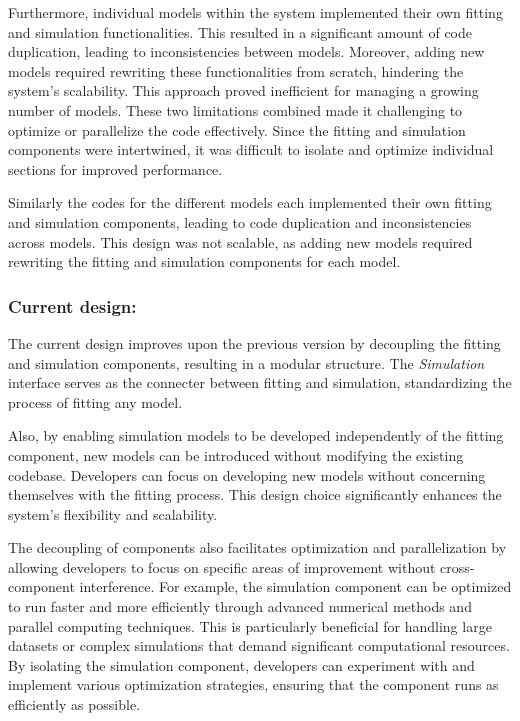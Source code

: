 Furthermore, individual models within the system implemented their own fitting and simulation functionalities. This resulted in a 
significant amount of code duplication, leading to inconsistencies between models. Moreover, adding new models required rewriting 
these functionalities from scratch, hindering the system's scalability. This approach proved inefficient for managing a growing number 
of models. These two limitations combined made it challenging to optimize or parallelize the code effectively. Since the fitting and 
simulation components were intertwined, it was difficult to isolate and optimize individual sections for improved performance.

\medskip

Similarly the codes for the different models each implemented their own fitting and simulation
components, leading to code duplication and inconsistencies across models. This design was not
scalable, as adding new models required rewriting the fitting and simulation components for each
model.

\subsubsection*{Current design:}

The current design improves upon the previous version by decoupling the fitting and 
simulation components, resulting in a modular structure. The \textit{Simulation} interface serves
 as the connecter between fitting and simulation, standardizing the process of fitting 
 any model.

\medskip

Also, by enabling simulation models to be developed independently of the fitting component, 
new models can be introduced without modifying the existing codebase. Developers can 
focus on developing new models without concerning themselves with the fitting process. 
This design choice significantly enhances the system's flexibility and scalability.

\medskip

The decoupling of components also facilitates optimization and 
parallelization by allowing developers to focus on specific areas of improvement without
 cross-component interference. For example, the simulation component can be optimized to
  run faster and more efficiently through advanced numerical methods and parallel 
  computing techniques. This is particularly beneficial for handling large datasets or complex simulations that demand significant 
  computational resources. By isolating the simulation component, developers can experiment with and implement various optimization strategies, 
  ensuring that the component runs as efficiently as possible.

